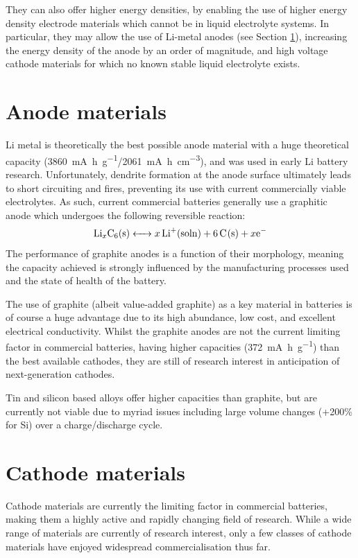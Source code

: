 They can also offer higher energy densities, by enabling the use of higher energy density electrode materials which cannot be in liquid electrolyte systems.
In particular, they may allow the use of Li-metal anodes (see Section \ref{sec:anodes}), increasing the energy density of the anode by an order of magnitude,\cite{Zhang2018} and high voltage cathode materials for which no known stable liquid electrolyte exists.

\section{Anode materials}
\label{sec:anodes}
Li metal is theoretically the best possible anode material with a huge theoretical capacity (\SI{3860}{\milli\ampere\hour\per\gram}/\SI{2061}{\milli\ampere\hour\per\centi\meter\cubed}), and was used in early Li battery research. 
Unfortunately, dendrite formation at the anode surface ultimately leads to short circuiting and fires, preventing its use with current commercially viable electrolytes. \cite{Cheng2017,Guo2017a,Lin2017}
As such, current commercial batteries generally use a graphitic anode which undergoes the following reversible reaction:\cite{Islam2014}
\begin{equation}
\ce{Li_xC6(s) <-> $x$Li+(soln) +6C(s) + $x$e-}
\end{equation}
The performance of graphite anodes is a function of their morphology, meaning the capacity achieved is strongly influenced by the manufacturing processes used and the state of health of the battery.

The use of graphite (albeit value-added graphite) as a key material in batteries is of course a huge advantage due to its high abundance, low cost, and excellent electrical conductivity.
Whilst the graphite anodes are not the current limiting factor in commercial batteries, having higher capacities (\SI{372}{\milli\ampere\hour\per\gram}) than the best available cathodes, they are still of research interest in anticipation of next-generation cathodes.

Tin and silicon based alloys offer higher capacities than graphite, but are currently not viable due to myriad issues including large volume changes (+200\% for Si) over a charge/discharge cycle.\cite{Scrosati2011}

\newpage
\section{Cathode materials}
Cathode materials are currently the limiting factor in commercial batteries, making them a highly active and rapidly changing field of research.\cite{Marom2011}
While a wide range of materials are currently of research interest, only a few classes of cathode materials have enjoyed widespread commercialisation thus far.


